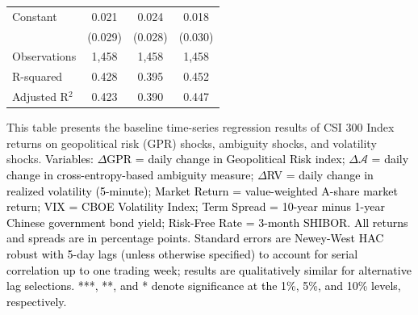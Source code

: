 \documentclass[preprint,12pt,authoryear]{elsarticle}
\begin{document}
\begin{table}[htbp]
\begin{threeparttable}
\begin{tabular*}{\textwidth}{@{\extracolsep{\fill}} lccc @{\extracolsep{\fill}}}
Constant & 0.021 & 0.024 & 0.018 \\
& (0.029) & (0.028) & (0.030) \\
\midrule
Observations & 1,458 & 1,458 & 1,458 \\
R-squared & 0.428 & 0.395 & 0.452 \\
Adjusted R$^2$ & 0.423 & 0.390 & 0.447 \\
\bottomrule
\end{tabular*}
\begin{tablenotes}[flushleft]
\small
\item[] This table presents the baseline time-series regression results of CSI 300 Index returns on geopolitical risk (GPR) shocks, ambiguity shocks, and volatility shocks. \textcolor{black}{Variables: $\Delta$GPR = daily change in Geopolitical Risk index; $\Delta \mathcal{A}$ = daily change in cross-entropy-based ambiguity measure; $\Delta$RV = daily change in realized volatility (5-minute); Market Return = value-weighted A-share market return; VIX = CBOE Volatility Index; Term Spread = 10-year minus 1-year Chinese government bond yield; Risk-Free Rate = 3-month SHIBOR. All returns and spreads are in percentage points.} \textcolor{black}{Standard errors are Newey-West HAC robust with 5-day lags (unless otherwise specified) to account for serial correlation up to one trading week; results are qualitatively similar for alternative lag selections. ***, **, and * denote significance at the 1\%, 5\%, and 10\% levels, respectively.}
\end{tablenotes}
\end{threeparttable}
\end{table}
\end{document}
